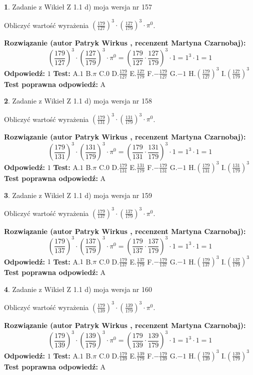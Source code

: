 \documentclass[12pt, a4paper]{article}
\theoremstyle{definition} %
\newtheorem{zad}{}
\newcommand{\zadStart}[1]{\begin{zad}#1\newline}
\newcommand{\zadStop}{\end{zad}}
\newcommand{\rozwStart}[2]{\noindent \textbf{Rozwiązanie (autor #1 , recenzent #2): }\newline}
\newcommand{\rozwStop}{\newline}
\newcommand{\odpStart}{\noindent \textbf{Odpowiedź:}\newline}
\newcommand{\odpStop}{\newline}
\newcommand{\testStart}{\noindent \textbf{Test:}\newline}
\newcommand{\testStop}{\newline}
\newcommand{\kluczStart}{\noindent \textbf{Test poprawna odpowiedź:}\newline}
\newcommand{\kluczStop}{\newline}
\begin{document}
\zadStart{Zadanie z Wikieł Z 1.1 d) moja wersja nr 157}

Obliczyć wartość wyrażenia $(\frac{179}{127})^{3} \cdot (\frac{127}{179})^{3} \cdot \pi^{0}$.
\zadStop
\rozwStart{Patryk Wirkus}{Martyna Czarnobaj}
$$(\frac{179}{127})^{3} \cdot (\frac{127}{179})^{3} \cdot \pi^{0} = (\frac{179}{127} \cdot \frac{127}{179})^{3} \cdot 1 = 1^{3} \cdot 1 = 1$$
\rozwStop
\odpStart
$1$
\odpStop
\testStart
A.$1$ B.$\pi$ C.$0$ D.$\frac{179}{127}$ E.$\frac{127}{179}$
F.$-\frac{179}{127}$ G.$-1$
H.$(\frac{179}{127})^{3}$
I.$(\frac{127}{179})^{3}$
\testStop
\kluczStart
A
\kluczStop



\zadStart{Zadanie z Wikieł Z 1.1 d) moja wersja nr 158}

Obliczyć wartość wyrażenia $(\frac{179}{131})^{3} \cdot (\frac{131}{179})^{3} \cdot \pi^{0}$.
\zadStop
\rozwStart{Patryk Wirkus}{Martyna Czarnobaj}
$$(\frac{179}{131})^{3} \cdot (\frac{131}{179})^{3} \cdot \pi^{0} = (\frac{179}{131} \cdot \frac{131}{179})^{3} \cdot 1 = 1^{3} \cdot 1 = 1$$
\rozwStop
\odpStart
$1$
\odpStop
\testStart
A.$1$ B.$\pi$ C.$0$ D.$\frac{179}{131}$ E.$\frac{131}{179}$
F.$-\frac{179}{131}$ G.$-1$
H.$(\frac{179}{131})^{3}$
I.$(\frac{131}{179})^{3}$
\testStop
\kluczStart
A
\kluczStop



\zadStart{Zadanie z Wikieł Z 1.1 d) moja wersja nr 159}

Obliczyć wartość wyrażenia $(\frac{179}{137})^{3} \cdot (\frac{137}{179})^{3} \cdot \pi^{0}$.
\zadStop
\rozwStart{Patryk Wirkus}{Martyna Czarnobaj}
$$(\frac{179}{137})^{3} \cdot (\frac{137}{179})^{3} \cdot \pi^{0} = (\frac{179}{137} \cdot \frac{137}{179})^{3} \cdot 1 = 1^{3} \cdot 1 = 1$$
\rozwStop
\odpStart
$1$
\odpStop
\testStart
A.$1$ B.$\pi$ C.$0$ D.$\frac{179}{137}$ E.$\frac{137}{179}$
F.$-\frac{179}{137}$ G.$-1$
H.$(\frac{179}{137})^{3}$
I.$(\frac{137}{179})^{3}$
\testStop
\kluczStart
A
\kluczStop



\zadStart{Zadanie z Wikieł Z 1.1 d) moja wersja nr 160}

Obliczyć wartość wyrażenia $(\frac{179}{139})^{3} \cdot (\frac{139}{179})^{3} \cdot \pi^{0}$.
\zadStop
\rozwStart{Patryk Wirkus}{Martyna Czarnobaj}
$$(\frac{179}{139})^{3} \cdot (\frac{139}{179})^{3} \cdot \pi^{0} = (\frac{179}{139} \cdot \frac{139}{179})^{3} \cdot 1 = 1^{3} \cdot 1 = 1$$
\rozwStop
\odpStart
$1$
\odpStop
\testStart
A.$1$ B.$\pi$ C.$0$ D.$\frac{179}{139}$ E.$\frac{139}{179}$
F.$-\frac{179}{139}$ G.$-1$
H.$(\frac{179}{139})^{3}$
I.$(\frac{139}{179})^{3}$
\testStop
\kluczStart
A
\kluczStop
\end{document}
